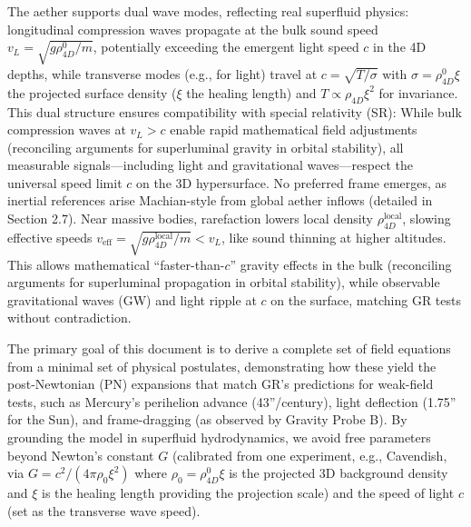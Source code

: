 \documentclass{article}
\begin{document}
The aether supports dual wave modes, reflecting real superfluid physics: longitudinal compression waves propagate at the bulk sound speed $v_L = \sqrt{g \rho_{4D}^0 / m}$, potentially exceeding the emergent light speed $c$ in the 4D depths, while transverse modes (e.g., for light) travel at $c = \sqrt{T / \sigma}$ with $\sigma = \rho_{4D}^0 \xi$ the projected surface density ($\xi$ the healing length) and $T \propto \rho_{4D} \xi^2$ for invariance. This dual structure ensures compatibility with special relativity (SR): While bulk compression waves at $v_L > c$ enable rapid mathematical field adjustments (reconciling arguments for superluminal gravity in orbital stability), all measurable signals---including light and gravitational waves---respect the universal speed limit $c$ on the 3D hypersurface. No preferred frame emerges, as inertial references arise Machian-style from global aether inflows (detailed in Section 2.7). Near massive bodies, rarefaction lowers local density $\rho_{4D}^{\text{local}}$, slowing effective speeds $v_{\text{eff}} = \sqrt{g \rho_{4D}^{\text{local}} / m} < v_L$, like sound thinning at higher altitudes. This allows mathematical ``faster-than-$c$'' gravity effects in the bulk (reconciling arguments for superluminal propagation in orbital stability), while observable gravitational waves (GW) and light ripple at $c$ on the surface, matching GR tests without contradiction.

The primary goal of this document is to derive a complete set of field equations from a minimal set of physical postulates, demonstrating how these yield the post-Newtonian (PN) expansions that match GR's predictions for weak-field tests, such as Mercury's perihelion advance (43''/century), light deflection (1.75'' for the Sun), and frame-dragging (as observed by Gravity Probe B). By grounding the model in superfluid hydrodynamics, we avoid free parameters beyond Newton's constant $G$ (calibrated from one experiment, e.g., Cavendish, via $G = c^2 / (4\pi \rho_0 \xi^2)$ where $\rho_0 = \rho_{4D}^0 \xi$ is the projected 3D background density and $\xi$ is the healing length providing the projection scale) and the speed of light $c$ (set as the transverse wave speed).
\end{document}
